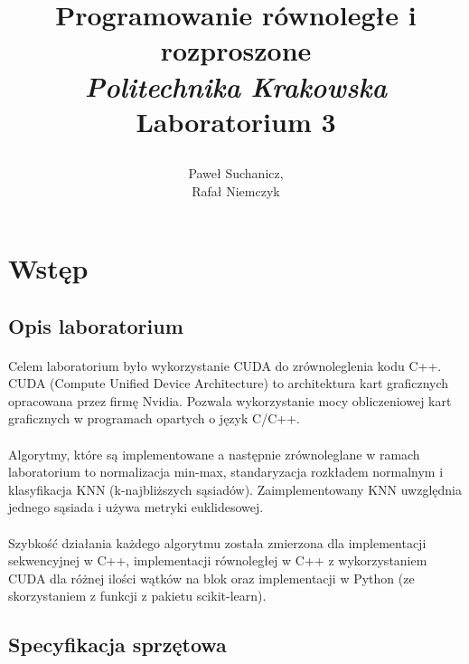 \documentclass[a4paper,11pt]{article}
\title{
	\textbf{Programowanie równoległe i rozproszone}\vspace{40pt}
	\\\textit{Politechnika Krakowska} \\\vspace{40pt}
	Laboratorium 3
	\vspace{300pt}

}
\author{
	Paweł Suchanicz,\\
	Rafał Niemczyk
}
\begin{document}
\begin{titlepage}
\maketitle
\end{titlepage}

\begin{center}
\tableofcontents
\end{center}
\newpage
\section{Wstęp}
\subsection{Opis laboratorium}
\paragraph{}Celem laboratorium było wykorzystanie CUDA do zrównoleglenia kodu C++. CUDA (Compute Unified Device Architecture) to architektura kart graficznych opracowana przez firmę Nvidia. Pozwala wykorzystanie mocy obliczeniowej kart graficznych w programach opartych o język C/C++.
\paragraph{}Algorytmy, które są implementowane a następnie zrównoleglane w ramach laboratorium to normalizacja min-max, standaryzacja rozkładem normalnym i klasyfikacja KNN (k-najbliższych sąsiadów). Zaimplementowany KNN  uwzględnia jednego sąsiada i używa metryki euklidesowej.
\paragraph{}Szybkość działania każdego algorytmu została zmierzona dla implementacji sekwencyjnej w C++, implementacji równoległej w C++ z wykorzystaniem CUDA dla różnej ilości wątków na blok oraz implementacji w Python (ze skorzystaniem z funkcji z pakietu scikit-learn).
\subsection{Specyfikacja sprzętowa}
\end{document}
